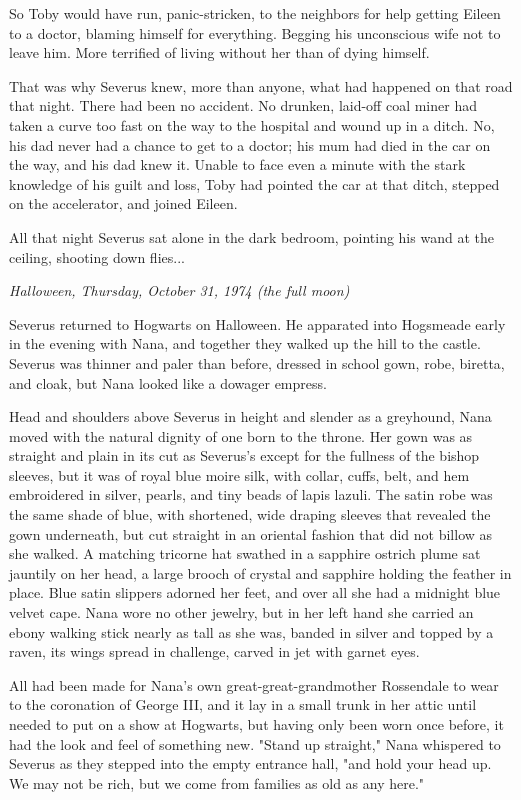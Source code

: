 \documentclass[a4paper,11pt]{article}
\begin{document}
So Toby would have run, panic-stricken, to the neighbors for help getting Eileen to a doctor, blaming himself for everything. Begging his unconscious wife not to leave him. More terrified of living without her than of dying himself.

That was why Severus knew, more than anyone, what had happened on that road that night. There had been no accident. No drunken, laid-off coal miner had taken a curve too fast on the way to the hospital and wound up in a ditch. No, his dad never had a chance to get to a doctor; his mum had died in the car on the way, and his dad knew it. Unable to face even a minute with the stark knowledge of his guilt and loss, Toby had pointed the car at that ditch, stepped on the accelerator, and joined Eileen.

All that night Severus sat alone in the dark bedroom, pointing his wand at the ceiling, shooting down flies...

\emph{Halloween, Thursday, October 31, 1974 (the full moon)}

Severus returned to Hogwarts on Halloween. He apparated into Hogsmeade early in the evening with Nana, and together they walked up the hill to the castle. Severus was thinner and paler than before, dressed in school gown, robe, biretta, and cloak, but Nana looked like a dowager empress.

Head and shoulders above Severus in height and slender as a greyhound, Nana moved with the natural dignity of one born to the throne. Her gown was as straight and plain in its cut as Severus's except for the fullness of the bishop sleeves, but it was of royal blue moire silk, with collar, cuffs, belt, and hem embroidered in silver, pearls, and tiny beads of lapis lazuli. The satin robe was the same shade of blue, with shortened, wide draping sleeves that revealed the gown underneath, but cut straight in an oriental fashion that did not billow as she walked. A matching tricorne hat swathed in a sapphire ostrich plume sat jauntily on her head, a large brooch of crystal and sapphire holding the feather in place. Blue satin slippers adorned her feet, and over all she had a midnight blue velvet cape. Nana wore no other jewelry, but in her left hand she carried an ebony walking stick nearly as tall as she was, banded in silver and topped by a raven, its wings spread in challenge, carved in jet with garnet eyes.

All had been made for Nana's own great-great-grandmother Rossendale to wear to the coronation of George III, and it lay in a small trunk in her attic until needed to put on a show at Hogwarts, but having only been worn once before, it had the look and feel of something new. "Stand up straight," Nana whispered to Severus as they stepped into the empty entrance hall, "and hold your head up. We may not be rich, but we come from families as old as any here."
\end{document}
